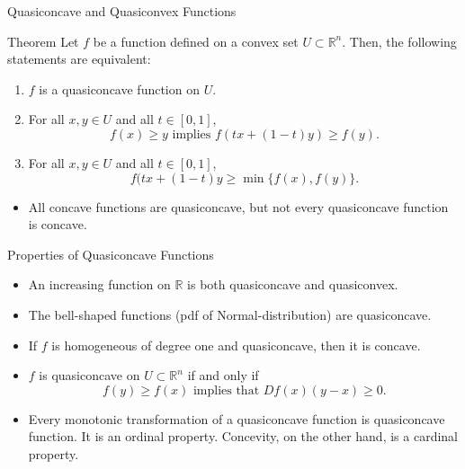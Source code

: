 \documentclass{beamer}
\begin{document}
\begin{frame}{Quasiconcave and Quasiconvex Functions}
\begin{block}{Theorem}
Let $f$ be a function defined on a convex set $U\subset \mathbb{R}^n$. Then, the following statements are equivalent:
\begin{enumerate}
    \item $f$ is a quasiconcave function on $U$. 
    \item For all $x,y\in U$ and all $t\in [0,1]$, 
    \[f(x)\geq y \text{ implies }f(tx+(1-t)y)\geq f(y).
    \]
    \item For all $x,y\in U$ and all $t\in [0,1]$,
    \[ f(tx+(1-t)y\geq \min \{f(x), f(y)\}.
    \]
\end{enumerate}
\end{block}
\begin{itemize}
    \item 
 All concave functions are quasiconcave, but not every quasiconcave function is concave. 
 \end{itemize}
\end{frame}
\begin{frame}{Properties of Quasiconcave Functions}
    \begin{itemize}
        \item An increasing function on $\mathbb{R}$ is both quasiconcave and quasiconvex.
        \item The bell-shaped functions (pdf of Normal-distribution) are quasiconcave. 
        \item If $f$ is homogeneous of degree one and quasiconcave, then it is concave. 
        \item $f$ is quasiconcave on $U\subset \mathbb{R}^n$ if and only if 
        \[f(y)\geq f(x) \text{ implies that }Df(x)(y-x)\geq 0.
        \]
        \item Every monotonic transformation of a quasiconcave function is quasiconcave function. It is an ordinal property. Concevity, on the other hand, is a cardinal property.
     \end{itemize}
\end{frame}
\end{document}
